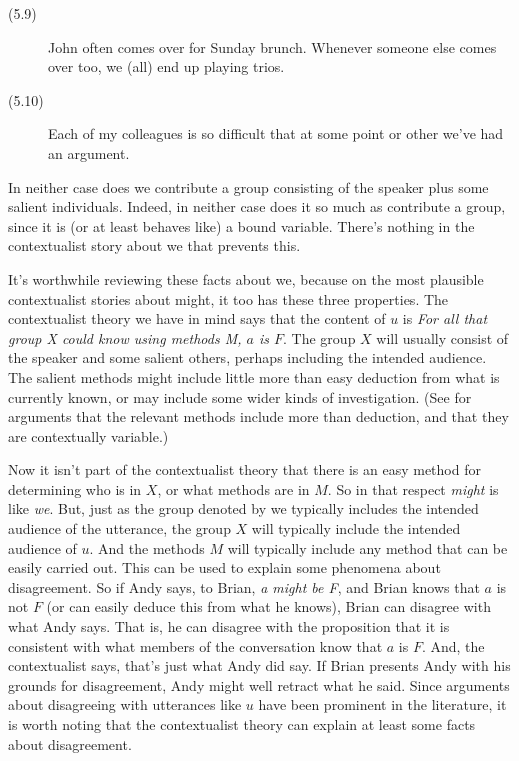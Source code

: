 \begin{description}
\item[(5.9)] John often comes over for Sunday brunch. Whenever someone else comes over too, we (all) end up playing trios. \citep{Partee1989}
\item[(5.10)] Each of my colleagues is so difficult that at some point or other we've had an argument. \citep{Schlenker2003}
\end{description}

\noindent In neither case does we contribute a group consisting of the speaker plus some salient individuals. Indeed, in neither case does it so much as contribute a group, since it is (or at least behaves like) a bound variable. There's nothing in the contextualist story about we that prevents this.

It's worthwhile reviewing these facts about we, because on the most plausible contextualist stories about might, it too has these three properties. The contextualist theory we have in mind says that the content of $u$ is \textit{For all that group X could know using methods M, $a$ is $F$}. The group $X$ will usually consist of the speaker and some salient others, perhaps including the intended audience. The salient methods might include little more than easy deduction from what is currently known, or may include some wider kinds of investigation. (See \citet{DeRose1991} for arguments that the relevant methods include more than deduction, and that they are contextually variable.)

Now it isn't part of the contextualist theory that there is an easy method for determining who is in $X$, or what methods are in $M$. So in that respect \textit{might} is like \textit{we}. But, just as the group denoted by we typically includes the intended audience of the utterance, the group $X$ will typically include the intended audience of $u$. And the methods $M$ will typically include any method that can be easily carried out. This can be used to explain some phenomena about disagreement. So if Andy says, to Brian, \textit{a might be F}, and Brian knows that $a$ is not $F$ (or can easily deduce this from what he knows), Brian can disagree with what Andy says. That is, he can disagree with the proposition that it is consistent with what members of the conversation know that $a$ is $F$. And, the contextualist says, that's just what Andy did say. If Brian presents Andy with his grounds for disagreement, Andy might well retract what he said. Since arguments about disagreeing with utterances like $u$ have been prominent in the literature, it is worth noting that the contextualist theory can explain at least some facts about disagreement.

